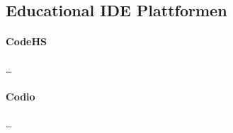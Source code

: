 \subsection{Educational IDE Plattformen}\label{section:stand-der-technik:weitere-entwicklungen:educational-ide-plattformen}

\paragraph{CodeHS} \dots

\paragraph{Codio} \dots


